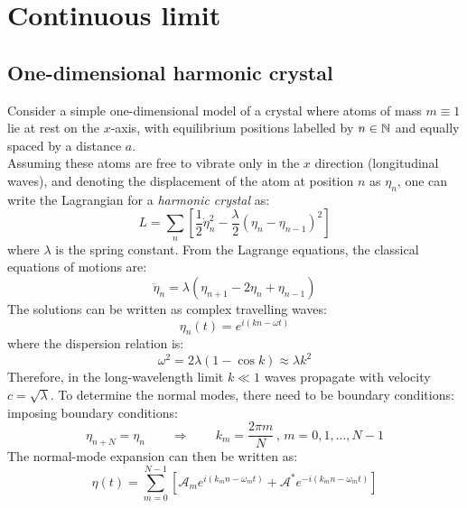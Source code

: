 
\section{Continuous limit}

\subsection{One-dimensional harmonic crystal}

Consider a simple one-dimensional model of a crystal where atoms of mass $ m \equiv 1 $ lie at rest on the $ x $-axis, with equilibrium positions labelled by $ n \in \mathbb{N} $ and equally spaced by a distance $ a $.\\
Assuming these atoms are free to vibrate only in the $ x $ direction (longitudinal waves), and denoting the displacement of the atom at position $ n $ as $ \eta_n $, one can write the Lagrangian for a \textit{harmonic crystal} as:
\begin{equation}
  L = \sum_{n} \left[ \frac{1}{2} \dot{\eta}_n^2 - \frac{\lambda}{2} \left( \eta_n - \eta_{n-1} \right)^2 \right]
  \label{eq:1.1}
\end{equation}
where $ \lambda $ is the spring constant. From the Lagrange equations, the classical equations of motions are:
\begin{equation}
  \ddot{\eta}_n = \lambda \left( \eta_{n+1} - 2 \eta_n + \eta_{n-1} \right)
  \label{eq:1.2}
\end{equation}
The solutions can be written as complex travelling waves:
\begin{equation}
  \eta_n (t) = e^{i \left( k n - \omega t \right)}
  \label{eq:1.3}
\end{equation}
where the dispersion relation is:
\begin{equation}
  \omega^2 = 2\lambda \left( 1 - \cos k \right) \approx \lambda k^2
  \label{eq:1.4}
\end{equation}
Therefore, in the long-wavelength limit $ k \ll 1 $ waves propagate with velocity $ c = \sqrt{\lambda} $. To determine the normal modes, there need to be boundary conditions: imposing boundary conditions:
\begin{equation}
  \eta_{n + N} = \eta_n \qquad \Rightarrow \qquad k_m = \frac{2\pi m}{N} \,,\, m = 0, 1, \dots, N - 1
  \label{eq:1.5}
\end{equation}
The normal-mode expansion can then be written as:
\begin{equation}
  \eta (t) = \sum_{m = 0}^{N - 1} \left[ \mathcal{A}_m e^{i \left( k_m n - \omega_m t \right)} + \mathcal{A}^* e^{-i \left( k_m n - \omega_m t \right)} \right]
  \label{eq:1.6}
\end{equation}
